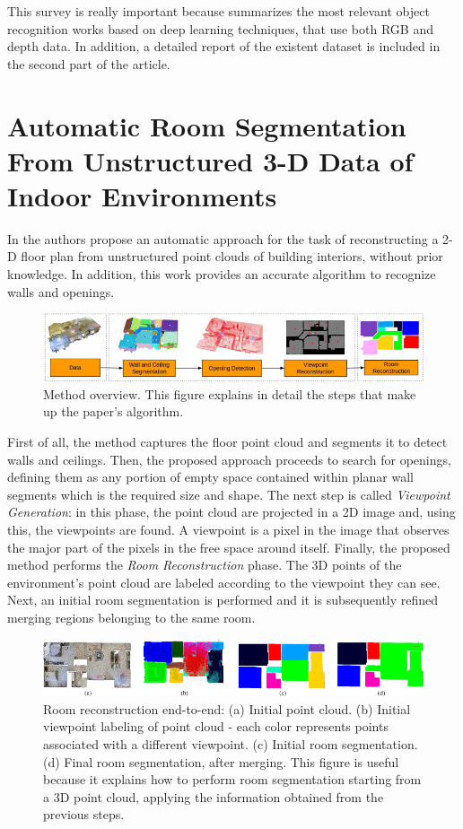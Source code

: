 This survey is really important because summarizes the most relevant object recognition works based on deep learning techniques, that use both RGB and depth data. In addition, a detailed report of the existent dataset is included in the second part of the article. 


\newpage

\section{Automatic Room Segmentation From Unstructured 3-D Data of Indoor Environments \cite{7814251}}

In \cite{7814251} the authors propose an automatic approach for the task of
reconstructing a 2-D floor plan from unstructured point clouds
of building interiors, without prior knowledge. In addition, this work provides an accurate algorithm to recognize walls and openings. 

\begin{figure}[h!]
	\centering
	\includegraphics[width=0.9\linewidth]{images/segm_method.png}
	\caption{Method overview. This figure explains in detail the steps that make up the paper's algorithm.}
\end{figure}

First of all, the method captures the floor point cloud and segments it to detect walls and ceilings. Then, the proposed approach proceeds to search for openings, defining them as any portion of empty space contained within planar wall segments which is the required size and shape. The next step is called \textit{Viewpoint Generation}: in this phase, the point cloud are projected in a 2D image and, using this, the viewpoints are found. A viewpoint is a pixel in the image that observes the major part of the pixels in the free space around itself. Finally, the proposed method performs the \textit{Room Reconstruction} phase. The 3D points of the environment's point cloud are labeled according to the viewpoint they can see. Next, an initial room segmentation is performed and it is subsequently refined merging regions belonging to the same room.

\begin{figure}[h!]
	\centering
	\includegraphics[width=0.9\linewidth]{images/room_seg.png}
	\caption{Room reconstruction end-to-end: (a) Initial point cloud. (b) Initial viewpoint labeling of point cloud - each color represents points associated with a
		different viewpoint. (c) Initial room segmentation. (d) Final room segmentation, after merging. This figure is useful because it explains how to perform room segmentation starting from a 3D point cloud, applying the information obtained from the previous steps.}
\end{figure}

